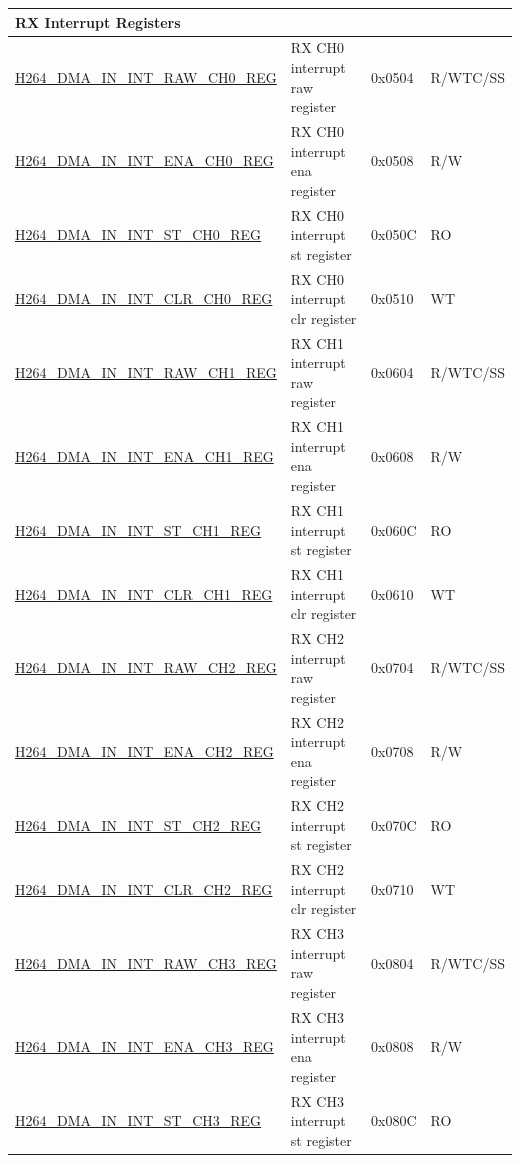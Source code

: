 \begin{longtable}{ | p{7.5cm} | p{5.7cm} | p{1.2cm} | p{1.5cm} | }
\multicolumn{4}{|l|}{\textbf{RX Interrupt Registers}} \\ \hline
\hyperref[regdesc:H264DMAININTRAWCH0REG]
{H264\_DMA\_IN\_INT\_RAW\_CH0\_REG} & RX CH0  interrupt raw register & 0x0504 & R/WTC/SS \\ \hline
\hyperref[regdesc:H264DMAININTENACH0REG]{H264\_DMA\_IN\_INT\_ENA\_CH0\_REG} & RX CH0  interrupt ena register & 0x0508 & R/W \\ \hline
\hyperref[regdesc:H264DMAININTSTCH0REG]{H264\_DMA\_IN\_INT\_ST\_CH0\_REG} & RX CH0  interrupt st register & 0x050C & RO \\ \hline
\hyperref[regdesc:H264DMAININTCLRCH0REG]{H264\_DMA\_IN\_INT\_CLR\_CH0\_REG} & RX CH0  interrupt clr register & 0x0510 & WT \\ \hline
\hyperref[regdesc:H264DMAININTRAWCH1REG]{H264\_DMA\_IN\_INT\_RAW\_CH1\_REG} & RX CH1  interrupt raw register & 0x0604 & R/WTC/SS \\ \hline
\hyperref[regdesc:H264DMAININTENACH1REG]{H264\_DMA\_IN\_INT\_ENA\_CH1\_REG} & RX CH1  interrupt ena register & 0x0608 & R/W \\ \hline
\hyperref[regdesc:H264DMAININTSTCH1REG]{H264\_DMA\_IN\_INT\_ST\_CH1\_REG} & RX CH1  interrupt st register & 0x060C & RO \\ \hline
\hyperref[regdesc:H264DMAININTCLRCH1REG]{H264\_DMA\_IN\_INT\_CLR\_CH1\_REG} & RX CH1  interrupt clr register & 0x0610 & WT \\ \hline
\hyperref[regdesc:H264DMAININTRAWCH2REG]{H264\_DMA\_IN\_INT\_RAW\_CH2\_REG} & RX CH2  interrupt raw register & 0x0704 & R/WTC/SS \\ \hline
\hyperref[regdesc:H264DMAININTENACH2REG]{H264\_DMA\_IN\_INT\_ENA\_CH2\_REG} & RX CH2  interrupt ena register & 0x0708 & R/W \\ \hline
\hyperref[regdesc:H264DMAININTSTCH2REG]{H264\_DMA\_IN\_INT\_ST\_CH2\_REG} & RX CH2  interrupt st register & 0x070C & RO \\ \hline
\hyperref[regdesc:H264DMAININTCLRCH2REG]{H264\_DMA\_IN\_INT\_CLR\_CH2\_REG} & RX CH2  interrupt clr register & 0x0710 & WT \\ \hline
\hyperref[regdesc:H264DMAININTRAWCH3REG]{H264\_DMA\_IN\_INT\_RAW\_CH3\_REG} & RX CH3  interrupt raw register & 0x0804 & R/WTC/SS \\ \hline
\hyperref[regdesc:H264DMAININTENACH3REG]{H264\_DMA\_IN\_INT\_ENA\_CH3\_REG} & RX CH3  interrupt ena register & 0x0808 & R/W \\ \hline
\hyperref[regdesc:H264DMAININTSTCH3REG]{H264\_DMA\_IN\_INT\_ST\_CH3\_REG} & RX CH3  interrupt st register & 0x080C & RO \\ \hline

\end{longtable}
